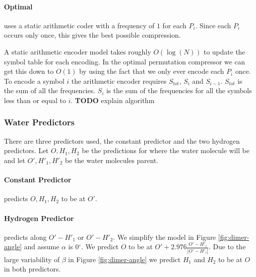 \documentclass{report}
\newcommand{\degree}{\ensuremath{^\circ}}
\begin{document}
\paragraph{Optimal} uses a static arithmetic coder with a frequency of $1$ for
each $P_i$. Since each $P_i$ occurs only once, this gives the best possible
compression.

A static arithmetic encoder model takes roughly $O(\log(N))$ to update the
symbol table for each encoding. In the optimal permutation compressor we can
get this down to $O(1)$ by using the fact that we only ever encode each $P_i$
once. To encode a symbol $i$ the arithmetic encoder requires $S_{tot}$, $S_i$
and $S_{i-1}$. $S_{tot}$ is the sum of all the frequencies. $S_i$ is the sum
of the frequencies for all the symbols less than or equal to
$i$. \textbf{TODO} explain algorithm

\subsubsection{Water Predictors}

There are three predictors used, the constant predictor and the two hydrogen
predictors. Let $O, H_1, H_2$ be the predictions for where the water molecule
will be and let $O', H'_1, H'_2$ be the water molecules parent.

\paragraph{Constant Predictor} predicts $O, H_1, H_2$ to be at $O'$.

\paragraph{Hydrogen Predictor} predicts along $O'-H'_1$ or $O'-H'_2$. We
simplify the model in Figure \ref{fig:dimer-angle} and assume $\alpha$ is
$0\degree$. We predict $O$ to be at $O' + 2.976\frac{O'-H'_i}{|O'-H'_i|}$. Due
to the large variability of $\beta$ in Figure \ref{fig:dimer-angle} we predict
$H_1$ and $H_2$ to be at $O$ in both predictors.


\nocite{*}

\end{document}
